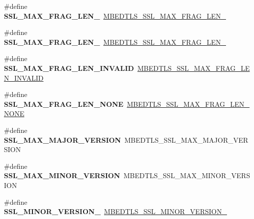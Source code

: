 \begin{DoxyCompactItemize}
\item 
\mbox{\label{compat-1_83_8h_a3c29a4f619719fdc1e96189033e0642d}} 
\#define {\bfseries S\+S\+L\+\_\+\+M\+A\+X\+\_\+\+F\+R\+A\+G\+\_\+\+L\+E\+N\+\_}~\mbox{\hyperlink{ssl_8h_adfe756e3f577397f4a3328b0e927bb6a}{M\+B\+E\+D\+T\+L\+S\+\_\+\+S\+S\+L\+\_\+\+M\+A\+X\+\_\+\+F\+R\+A\+G\+\_\+\+L\+E\+N\+\_}}
\item 
\mbox{\label{compat-1_83_8h_a6bf67eb19ce0cebd6592ac5cba5c2411}} 
\#define {\bfseries S\+S\+L\+\_\+\+M\+A\+X\+\_\+\+F\+R\+A\+G\+\_\+\+L\+E\+N\+\_}~\mbox{\hyperlink{ssl_8h_a148f83e96299be6220fc3c922cfb58d5}{M\+B\+E\+D\+T\+L\+S\+\_\+\+S\+S\+L\+\_\+\+M\+A\+X\+\_\+\+F\+R\+A\+G\+\_\+\+L\+E\+N\+\_}}
\item 
\mbox{\label{compat-1_83_8h_acb1200880a9fc9fea4c776242d246cb1}} 
\#define {\bfseries S\+S\+L\+\_\+\+M\+A\+X\+\_\+\+F\+R\+A\+G\+\_\+\+L\+E\+N\+\_\+\+I\+N\+V\+A\+L\+ID}~\mbox{\hyperlink{ssl_8h_a256731a4bb52bb1960cc88ec4f350926}{M\+B\+E\+D\+T\+L\+S\+\_\+\+S\+S\+L\+\_\+\+M\+A\+X\+\_\+\+F\+R\+A\+G\+\_\+\+L\+E\+N\+\_\+\+I\+N\+V\+A\+L\+ID}}
\item 
\mbox{\label{compat-1_83_8h_a1e3348879ac88b7bb93b5d503c05e13c}} 
\#define {\bfseries S\+S\+L\+\_\+\+M\+A\+X\+\_\+\+F\+R\+A\+G\+\_\+\+L\+E\+N\+\_\+\+N\+O\+NE}~\mbox{\hyperlink{ssl_8h_a952256aaeb342b5f8cb55fb39891b235}{M\+B\+E\+D\+T\+L\+S\+\_\+\+S\+S\+L\+\_\+\+M\+A\+X\+\_\+\+F\+R\+A\+G\+\_\+\+L\+E\+N\+\_\+\+N\+O\+NE}}
\item 
\mbox{\label{compat-1_83_8h_ab9777574c0f3b3d13e5c4e00981b7834}} 
\#define {\bfseries S\+S\+L\+\_\+\+M\+A\+X\+\_\+\+M\+A\+J\+O\+R\+\_\+\+V\+E\+R\+S\+I\+ON}~M\+B\+E\+D\+T\+L\+S\+\_\+\+S\+S\+L\+\_\+\+M\+A\+X\+\_\+\+M\+A\+J\+O\+R\+\_\+\+V\+E\+R\+S\+I\+ON
\item 
\mbox{\label{compat-1_83_8h_a74783bb987193059554331dba3b553ab}} 
\#define {\bfseries S\+S\+L\+\_\+\+M\+A\+X\+\_\+\+M\+I\+N\+O\+R\+\_\+\+V\+E\+R\+S\+I\+ON}~M\+B\+E\+D\+T\+L\+S\+\_\+\+S\+S\+L\+\_\+\+M\+A\+X\+\_\+\+M\+I\+N\+O\+R\+\_\+\+V\+E\+R\+S\+I\+ON
\item 
\mbox{\label{compat-1_83_8h_a4fedd81485a2c0a99b8d0d1dea245302}} 
\#define {\bfseries S\+S\+L\+\_\+\+M\+I\+N\+O\+R\+\_\+\+V\+E\+R\+S\+I\+O\+N\+\_}~\mbox{\hyperlink{ssl_8h_a29f89cb1c3fa78a8c57f683495feff15}{M\+B\+E\+D\+T\+L\+S\+\_\+\+S\+S\+L\+\_\+\+M\+I\+N\+O\+R\+\_\+\+V\+E\+R\+S\+I\+O\+N\+\_}}

\end{DoxyCompactItemize}
